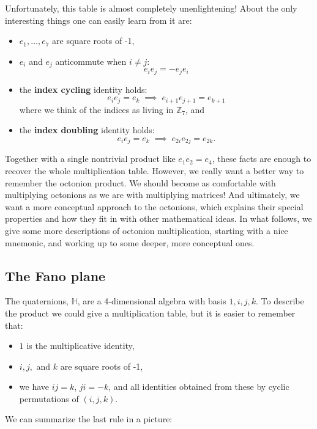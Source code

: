 \documentclass[12pt]{article}
\newcommand\Z{{\mathbb Z}}
\renewcommand\H{{\mathbb H}}
\begin{document}
\noindent
Unfortunately, this table is almost completely unenlightening!  About the only 
interesting things one can easily learn from it are:  
\begin{itemize}   
\item $e_1,\dots,e_7$ are square roots of -1,    
\item $e_i$ and $e_j$ anticommute when $i \ne j$:    
\[     e_i e_j = -e_j e_i   \]   
\item the {\bf index cycling} identity holds:   
\[       e_i e_j = e_k \; \implies\; e_{i+1} e_{j+1} = e_{k+1}  \]   
where we think of the indices as living in $\Z_7$, and   
\item the {\bf index doubling} identity holds:   
\[       e_i e_j = e_k \; \implies \; e_{2i} e_{2j} = e_{2k} . \]   
\end{itemize}   
Together with a single nontrivial product like $e_1 e_2 = e_4$, these   
facts are enough to recover the whole multiplication table.  However, we   
really want a better way to remember the octonion product.  We should   
become as comfortable with multiplying octonions as we are with   
multiplying matrices!  And ultimately, we want a more conceptual    
approach to the octonions, which explains their special properties and   
how they fit in with other mathematical ideas.  In what follows, we give   
some more descriptions of octonion multiplication, starting with a nice   
mnemonic, and working up to some deeper, more conceptual ones.   
   
\subsection{The Fano plane}    \label{fano}   
   
The quaternions, $\H$, are a 4-dimensional algebra with basis $1,i,j,k$.   
To describe the product we could give a multiplication   
table, but it is easier to remember that:   
\begin{itemize}   
\item $1$ is the multiplicative identity,   
\item $i,j,$ and $k$ are square roots of -1,   
\item we have $ij = k$, $ji = -k$, and all identities obtained    
from these by cyclic permutations of $(i,j,k)$.     
\end{itemize}   
We can summarize the last rule in a picture:   
 
\centerline{\epsfysize=1.5in}   
\label{triangle}   
 
\end{document}
